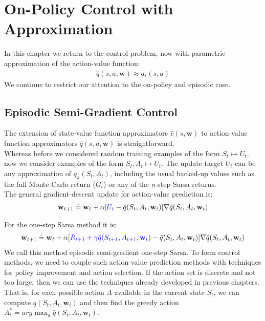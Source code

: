 
\section{On-Policy Control with Approximation}
In this chapter we return to the control problem, now with parametric approximation of the action-value function:
\begin{align}
    \hat{q}(s,a,\mathbf{w})\approx q_*(s,a)
\end{align}
We continue to restrict our attention to the on-policy and episodic case.
\subsection{Episodic Semi-Gradient Control}
The extension of state-value function approximators $\hat{v}(s,\mathbf{w})$ to action-value function approximators $\hat{q}(s,a,\mathbf{w})$ is straightforward.\\

Whereas before we considered random training examples of the form $S_t\mapsto U_t$, now we consider examples of the form $S_t, A_t\mapsto U_t$. The update target $U_t$ can be any approximation of $q_\pi(S_t, A_t)$, including the usual backed-up values such as the full Monte Carlo return ($G_t$) or any
of the \textit{n}-step Sarsa returns.\\

The general gradient-descent update for action-value prediction is:
\begin{align}
    \mathbf{w}_{t+1}\doteq\mathbf{w}_t+\alpha[\textcolor{blue}{U_t}-\hat{q}(S_t, A_t, \mathbf{w}_t)]\nabla \hat{q}(S_t, A_t, \mathbf{w}_t)
\end{align}

For the one-step Sarsa method it is:
\begin{align}
    \mathbf{w}_{t+1}\doteq\mathbf{w}_t+\alpha[\textcolor{blue}{R_{t+1}+\gamma\hat{q}(S_{t+1}, A_{t+1}, \mathbf{w}_t)}-\hat{q}(S_t, A_t, \mathbf{w}_t)]\nabla \hat{q}(S_t, A_t, \mathbf{w}_t)
\end{align}
We call this method episodic semi-gradient one-step Sarsa.
To form control methods, we need to couple such action-value prediction methods with techniques for policy improvement and action selection. If the action set is discrete and not too large, then we can use the techniques already developed in previous chapters. That is, for each possible action $A$ available in the current state $S_t$, we can compute $q(S_t, A_t, \mathbf{w}_t)$ and then find the greedy action $A_t^*=arg\max_a \hat{q}(S_t, A_t, \mathbf{w}_t)$.

